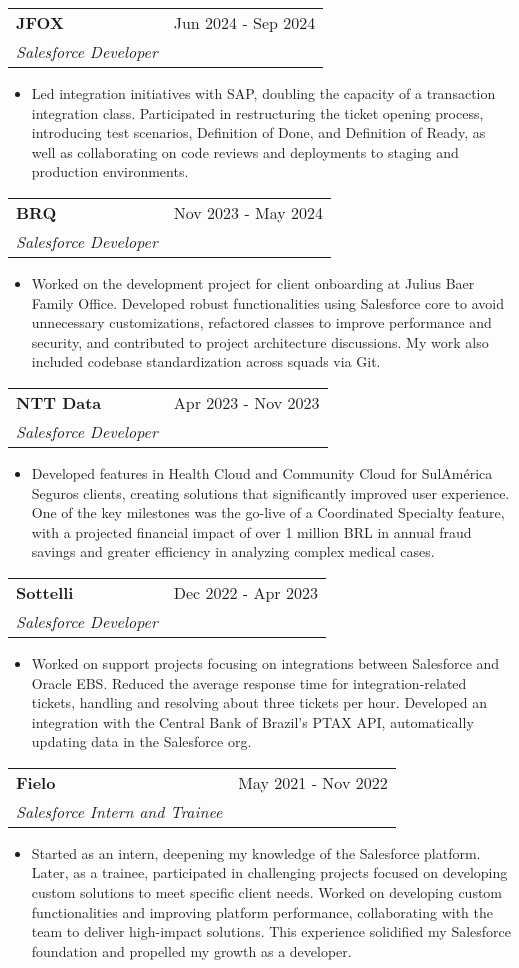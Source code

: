\documentclass[letterpaper,11pt]{article}
\makeatletter
\newcommand{\resumeItem}[1]{
  \item\small{
    {#1 \vspace{-2pt}}
  }
}
\newcommand{\resumeSubheading}[4]{
  \vspace{-2pt}\item
    \begin{tabular*}{0.97\textwidth}[t]{l@{\extracolsep{\fill}}r}
      \textbf{#1} & #2 \\
      \textit{\small#3} & \textit{\small #4} \\
    \end{tabular*}\vspace{-7pt}
}
\newcommand{\resumeItemListStart}{\begin{itemize}}
\newcommand{\resumeItemListEnd}{\end{itemize}\vspace{-5pt}}
\makeatother
\begin{document}
    \resumeSubheading
      {JFOX}{Jun 2024 - Sep 2024}{Salesforce Developer}{}
      \resumeItemListStart
        \resumeItem{Led integration initiatives with SAP, doubling the capacity of a transaction integration class. Participated in restructuring the ticket opening process, introducing test scenarios, Definition of Done, and Definition of Ready, as well as collaborating on code reviews and deployments to staging and production environments.} 
      \resumeItemListEnd
  
    \resumeSubheading
      {BRQ}{Nov 2023 - May 2024}{Salesforce Developer}{}
      \resumeItemListStart
        \resumeItem{Worked on the development project for client onboarding at Julius Baer Family Office. Developed robust functionalities using Salesforce core to avoid unnecessary customizations, refactored classes to improve performance and security, and contributed to project architecture discussions. My work also included codebase standardization across squads via Git.} 
      \resumeItemListEnd
  
    \resumeSubheading
      {NTT Data}{Apr 2023 - Nov 2023}{Salesforce Developer}{}
      \resumeItemListStart
        \resumeItem{Developed features in Health Cloud and Community Cloud for SulAmérica Seguros clients, creating solutions that significantly improved user experience. One of the key milestones was the go-live of a Coordinated Specialty feature, with a projected financial impact of over 1 million BRL in annual fraud savings and greater efficiency in analyzing complex medical cases.} 
      \resumeItemListEnd
  
    \resumeSubheading
      {Sottelli}{Dec 2022 - Apr 2023}{Salesforce Developer}{}
      \resumeItemListStart
        \resumeItem{Worked on support projects focusing on integrations between Salesforce and Oracle EBS. Reduced the average response time for integration-related tickets, handling and resolving about three tickets per hour. Developed an integration with the Central Bank of Brazil's PTAX API, automatically updating data in the Salesforce org.} 
      \resumeItemListEnd
  
    \resumeSubheading
      {Fielo}{May 2021 - Nov 2022}{Salesforce Intern and Trainee}{}
      \resumeItemListStart
        \resumeItem{Started as an intern, deepening my knowledge of the Salesforce platform. Later, as a trainee, participated in challenging projects focused on developing custom solutions to meet specific client needs. Worked on developing custom functionalities and improving platform performance, collaborating with the team to deliver high-impact solutions. This experience solidified my Salesforce foundation and propelled my growth as a developer.} 
      \resumeItemListEnd
  
\end{document}
